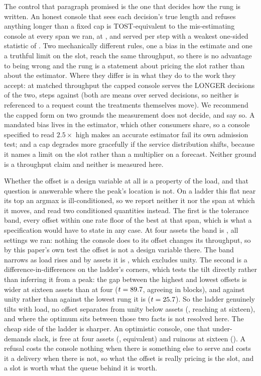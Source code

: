 \documentclass[11pt]{article}
\begin{document}
The control that paragraph promised is the one that decides how the rung is written. An honest
console that sees each decision's true length and refuses anything longer than a fixed cap is
TOST-equivalent to the mis-estimating console at every span we ran, at \CapEffOne{},
\CapEffTwo{} and \CapEffThree{} served per step with a weakest one-sided statistic of
\CapTostWeak{}. Two mechanically different rules, one a bias in the estimate and one a truthful
limit on the slot, reach the same throughput, so there is no advantage to being wrong and the rung
is a statement about pricing the slot rather than about the estimator. Where they differ is in
what they do to the work they accept: at matched throughput the capped console serves the LONGER
decisions of the two, \CapSvcHonest{} steps against \CapSvcBias{} (both are means over served
decisions, so neither is referenced to a request count the treatments themselves move). We
recommend the capped form on two grounds the measurement does not decide, and say so. A mandated
bias lives in the estimator, which other consumers share, so a console specified to read
\(2.5\times\) high makes an accurate estimator fail its own admission test; and a cap degrades
more gracefully if the service distribution shifts, because it names a limit on the slot rather
than a multiplier on a forecast. Neither ground is a throughput claim and neither is measured
here.

Whether the offset is a design variable at all is a property of the load, and that question is
answerable where the peak's location is not. On a ladder this flat near its top an argmax is
ill-conditioned, so we report neither it nor the span at which it moves, and read two conditioned
quantities instead. The first is the tolerance band, every offset within one rate floor of the best
at that span, which is what a specification would have to state in any case. At four assets the
band is \CapBandLow{}, all \CapBandLowWidth{} settings we ran: nothing the console does to its
offset changes its throughput, so by this paper's own test the offset is not a design variable
there. The band narrows as load rises and by \CapBandNarrows{} assets it is \CapBandHigh{}, which
excludes unity. The second is a difference-in-differences on the ladder's corners, which tests the
tilt directly rather than inferring it from a peak: the gap between the highest and lowest offsets
is \CapTiltWide{} wider at sixteen assets than at four ($t = 89.7{}$, agreeing in
\CapTiltBlocks{} blocks), and against unity rather than against the lowest rung it is
\CapTiltRef{} ($t = 25.7{}$). So the ladder genuinely tilts with load, no offset separates
from unity below \CapGateFirst{} assets (\CapFineTwelve{}, reaching \CapFineSixteen{} at sixteen),
and where the optimum sits between those two facts is not resolved here. The cheap side of the
ladder is sharper. An optimistic console, one that under-demands slack, is
free at four assets (\BiOptGapFour{}, equivalent) and ruinous at sixteen (\BiOptGapSixteen{}). A
refusal costs the console nothing when there is something else to serve and costs it a delivery when
there is not, so what the offset is really pricing is the slot, and a slot is worth what the queue
behind it is worth.
\end{document}

